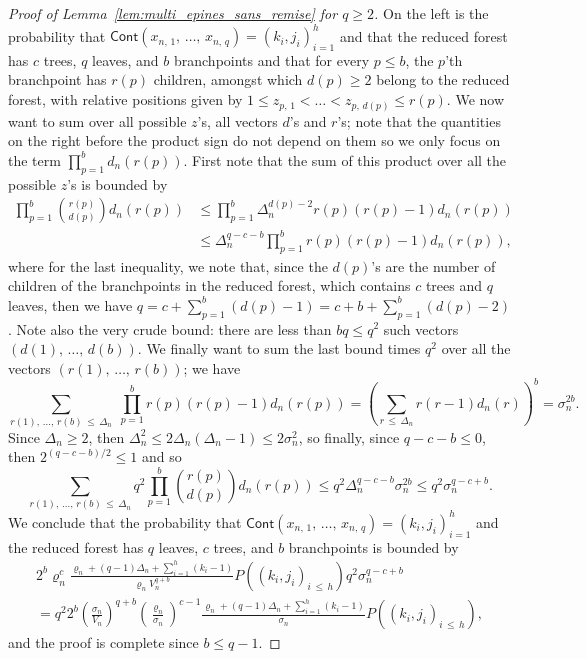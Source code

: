 \documentclass[10pt]{amsart}
\theoremstyle{definition}\newtheorem{defi}[theo]{Definition}\newtheorem{rema}[theo]{Remark}\newtheorem{exam}[theo]{Example}\newtheorem{exem}[theo]{Example}\newtheorem{nota}[theo]{Notation}
\newcommand{\1}{\ensembles{1}}
\renewcommand{\le}{\leqslant}
\renewcommand{\ge}{\geqslant}
\newcommand{\Cont}{\mathsf{Cont}}
\newcommand{\vertices}{V}
\providecommand{\?}{}
\begin{document}
\begin{proof}[Proof of Lemma~\ref{lem:multi_epines_sans_remise} for $q \ge 2$]
On the left is the probability that $\Cont(x_{n,\,1}, \,\dots,\,x_{n,\,q}) = (k_i, j_i)_{i=1}^h$ and that the reduced forest has $c$ trees, $q$ leaves, and $b$ branchpoints and that for every $p \le b$, the $p$'th branchpoint has $r(p)$ children, amongst which $d(p) \ge 2$ belong to the reduced forest, with relative positions given by $1 \le z_{p,\,1} < \dots < z_{p,\,d(p)} \le r(p)$. We now want to sum over all possible $z$'s, all vectors $d$'s and $r$'s; note that the quantities on the right before the product sign do not depend on them so we only focus on the term $\prod_{p=1}^b d_n(r(p))$. First note that the sum of this product over all the possible $z$'s is bounded by
\begin{align*}
\prod_{p=1}^b \binom{r(p)}{d(p)} d_n(r(p)) &\le \prod_{p=1}^b \Delta_n^{d(p)-2} r(p)(r(p) - 1) d_n(r(p))
\\
&\le \Delta_n^{q - c - b} \prod_{p=1}^b r(p)(r(p) - 1) d_n(r(p)),
\end{align*}
where for the last inequality, we note that, since the $d(p)$'s are the number of children of the branchpoints in the reduced forest, which contains $c$ trees and $q$ leaves, then we have $q = c + \sum_{p=1}^b (d(p)-1) = c + b + \sum_{p=1}^b (d(p)-2)$. Note also the very crude bound: there are less than $b q \le q^2$ such vectors $(d(1),\,\dots,\,d(b))$. We finally want to sum the last bound times $q^2$ over all the vectors $(r(1),\,\dots,\, r(b))$; we have
\[
\sum_{r(1),\,\dots,\,r(b)\,\le\,\Delta_n}\;\prod_{p=1}^b r(p)\left(r(p) - 1\right) d_n(r(p)) = \left(\sum_{r\,\le\, \Delta_n} r (r-1) d_n(r)\right)^b = \sigma_n^{2b}.
\]
Since $\Delta_n \ge 2$, then $\Delta_n^2 \le 2 \Delta_n (\Delta_n - 1) \le 2\sigma_n^2$, so finally, since $q - c - b \le 0$, then $2^{(q - c - b)/2} \le 1$ and so
\[
\sum_{r(1),\,\dots,\,r(b)\,\le\,\Delta_n} q^2 \prod_{p=1}^b \binom{r(p)}{d(p)} d_n(r(p))
\le q^2 \Delta_n^{q - c - b} \sigma_n^{2b}
\le q^2 \sigma_n^{q - c + b}.
\]
We conclude that the probability that $\Cont(x_{n,\,1}, \,\dots,\,x_{n,\,q}) = (k_i, j_i)_{i=1}^h$ and the reduced forest has $q$ leaves, $c$ trees, and $b$ branchpoints is bounded by
\begin{multline*}
2^b \varrho_n^c \frac{\varrho_n + (q-1) \Delta_n + \sum\limits_{i=1}^h \left(k_i - 1\right)}{\varrho_n \vertices_n^{q+b}} P\left(\left(k_i, j_i\right)_{i\,\le\, h}\right) q^2 \sigma_n^{q - c + b}
\\
= q^2 2^b \left(\frac{\sigma_n}{\vertices_n}\right)^{q+b} \left(\frac{\varrho_n}{\sigma_n}\right)^{c-1} \frac{\varrho_n + (q-1) \Delta_n + \sum_{i=1}^h \left(k_i - 1\right)}{\sigma_n} P\left(\left(k_i, j_i\right)_{i\,\le\,h}\right),
\end{multline*}
and the proof is complete since $b \le q-1$.
\end{proof}
\end{document}
